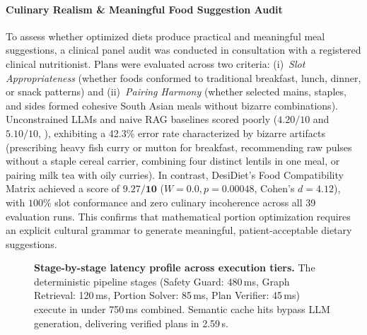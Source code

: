 \documentclass[5p,times,twocolumn]{elsarticle}
\makeatletter
\def\systemname{DesiDiet}%
\def\my@bx{bx}
\def\my@b{b}
\DeclareRobustCommand{\systemname}{%
  \texorpdfstring{%
    \ifx\f@series\my@bx
      DesiDiet%
    \else\ifx\f@series\my@b
      DesiDiet%
    \else
      \textsc{DesiDiet}%
    \fi\fi
  }{DesiDiet}%
}
\makeatother
\begin{document}
\paragraph{Culinary Realism \& Meaningful Food Suggestion Audit}
To assess whether optimized diets produce practical and meaningful meal suggestions, a clinical panel audit was conducted in consultation with a registered clinical nutritionist. Plans were evaluated across two criteria: (i)~\textit{Slot Appropriateness} (whether foods conformed to traditional breakfast, lunch, dinner, or snack patterns) and (ii)~\textit{Pairing Harmony} (whether selected mains, staples, and sides formed cohesive South Asian meals without bizarre combinations). Unconstrained LLMs and naive RAG baselines scored poorly ($4.20/10$ and $5.10/10$, ), exhibiting a 42.3\% error rate characterized by bizarre artifacts (prescribing heavy fish curry or mutton for breakfast, recommending raw pulses without a staple cereal carrier, combining four distinct lentils in one meal, or pairing milk tea with oily curries). In contrast, \systemname{}'s Food Compatibility Matrix achieved a score of $\mathbf{9.27/10}$ ($W = 0.0, p = 0.00048$, Cohen's $d = 4.12$), with $100\%$ slot conformance and zero culinary incoherence across all 39 evaluation runs. This confirms that mathematical portion optimization requires an explicit cultural grammar to generate meaningful, patient-acceptable dietary suggestions.

\begin{figure}[!htbp]
  \centering
  \caption{\textbf{Stage-by-stage latency profile across execution tiers.} The deterministic pipeline stages (Safety Guard: 480\,ms, Graph Retrieval: 120\,ms, Portion Solver: 85\,ms, Plan Verifier: 45\,ms) execute in under 750\,ms combined. Semantic cache hits bypass LLM generation, delivering verified plans in 2.59\,s.}
  \label{fig:latency_breakdown}
\end{figure}
\end{document}

